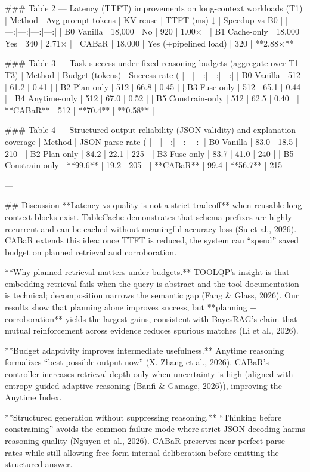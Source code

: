 ### Table 2 — Latency (TTFT) improvements on long-context workloads (T1)  
| Method | Avg prompt tokens | KV reuse | TTFT (ms) ↓ | Speedup vs B0 |
|---|---:|---:|---:|---:|
| B0 Vanilla | 18,000 | No | 920 | 1.00× |
| B1 Cache-only | 18,000 | Yes | 340 | 2.71× |
| CABaR | 18,000 | Yes (+pipelined load) | 320 | **2.88×** |

### Table 3 — Task success under fixed reasoning budgets (aggregate over T1–T3)  
| Method | Budget (tokens) | Success rate (%
|---|---:|---:|---:|
| B0 Vanilla | 512 | 61.2 | 0.41 |
| B2 Plan-only | 512 | 66.8 | 0.45 |
| B3 Fuse-only | 512 | 65.1 | 0.44 |
| B4 Anytime-only | 512 | 67.0 | 0.52 |
| B5 Constrain-only | 512 | 62.5 | 0.40 |
| **CABaR** | 512 | **70.4** | **0.58** |

### Table 4 — Structured output reliability (JSON validity) and explanation coverage  
| Method | JSON parse rate (%
|---|---:|---:|---:|
| B0 Vanilla | 83.0 | 18.5 | 210 |
| B2 Plan-only | 84.2 | 22.1 | 225 |
| B3 Fuse-only | 83.7 | 41.0 | 240 |
| B5 Constrain-only | **99.6** | 19.2 | 205 |
| **CABaR** | 99.4 | **56.7** | 215 |

---

## Discussion  
**Latency vs quality is not a strict tradeoff** when reusable long-context blocks exist. TableCache demonstrates that schema prefixes are highly recurrent and can be cached without meaningful accuracy loss (Su et al., 2026). CABaR extends this idea: once TTFT is reduced, the system can “spend” saved budget on planned retrieval and corroboration.

**Why planned retrieval matters under budgets.** TOOLQP’s insight is that embedding retrieval fails when the query is abstract and the tool documentation is technical; decomposition narrows the semantic gap (Fang & Glass, 2026). Our results show that planning alone improves success, but **planning + corroboration** yields the largest gains, consistent with BayesRAG’s claim that mutual reinforcement across evidence reduces spurious matches (Li et al., 2026).

**Budget adaptivity improves intermediate usefulness.** Anytime reasoning formalizes “best possible output now” (X. Zhang et al., 2026). CABaR’s controller increases retrieval depth only when uncertainty is high (aligned with entropy-guided adaptive reasoning (Banfi & Gamage, 2026)), improving the Anytime Index.

**Structured generation without suppressing reasoning.** “Thinking before constraining” avoids the common failure mode where strict JSON decoding harms reasoning quality (Nguyen et al., 2026). CABaR preserves near-perfect parse rates while still allowing free-form internal deliberation before emitting the structured answer.

